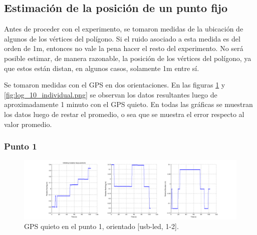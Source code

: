 \documentclass[spanish,12pt,a4paper,titlepage]{report}
\begin{document}
%

\newpage
\subsection{Estimación de la posición de un punto fijo}
\label{sec:estimacion-de-la-posicion-de-un-punto-fijo}

Antes de proceder con el experimento, se tomaron medidas de la ubicación de algunos de los vértices del polígono. Si el ruido asociado a esta medida es del orden de 1m, entonces no vale la pena hacer el resto del experimento. No será posible estimar, de manera razonable, la posición de los vértices del polígono, ya que estos están distan, en algunos casos, solamente 1m entre sí.

Se tomaron medidas con el GPS en dos orientaciones. En las figuras \ref{fig:log_09_individual.png} y \ref{fig:log_10_individual.png} se observan los datos resultantes luego de aproximadamente 1 minuto con el GPS quieto. En todas las gráficas se muestran los datos luego de restar el promedio, o sea que se muestra el error respecto al valor promedio.

\subsubsection*{Punto 1}
\label{sec:punto-1}

\begin{figure}[h!]
  \hspace{-70pt}
  \includegraphics[width=1.3\textwidth]{./img/log_09_individual.png}
  \caption{GPS quieto en el punto 1, orientado [usb-led, 1-2].}
  \label{fig:log_09_individual.png}
\end{figure}
\end{document}
